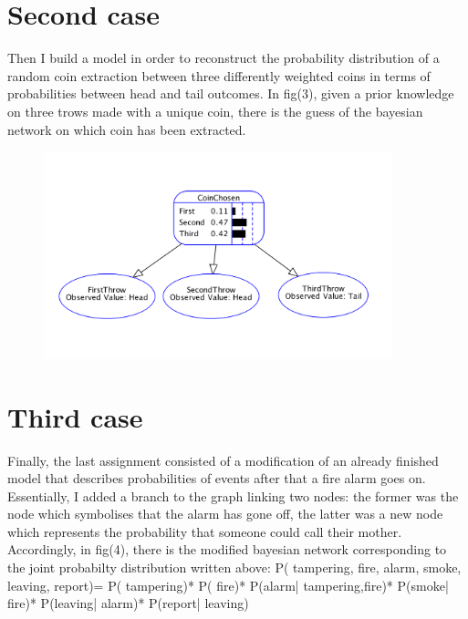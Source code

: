 \documentclass{article}
\begin{document}
				\section{Second case}
				Then I build a model in order to reconstruct the probability distribution of a random coin extraction between three differently weighted coins in terms of probabilities between head and tail outcomes.
				In fig(3), given a prior knowledge on three trows made with a unique coin, there is the guess of the bayesian network on which coin has been extracted. 
\begin{center}
\begin{figure}
\centering
\includegraphics[width=0.9\textwidth]{fig3}
\caption{}
\label{fig:3}
\end{figure}
\end{center}


				\section{Third case}
Finally, the last assignment consisted of a modification of an already finished model that describes probabilities of events after that a fire alarm goes on.
Essentially, I added a branch to the graph linking two nodes: the former was the node which symbolises  that the alarm has gone off, the latter was a new node which represents the probability that someone could call their mother.
Accordingly, in fig(4), there is the modified bayesian network corresponding to the joint probabilty distribution written above: 
\medskip
P( tampering, fire, alarm, smoke, leaving, report)=
\smallskip 
	P( tampering)* P( fire)* P(alarm| tampering,fire)* P(smoke| fire)* P(leaving| alarm)* P(report| leaving)
\end{document}

